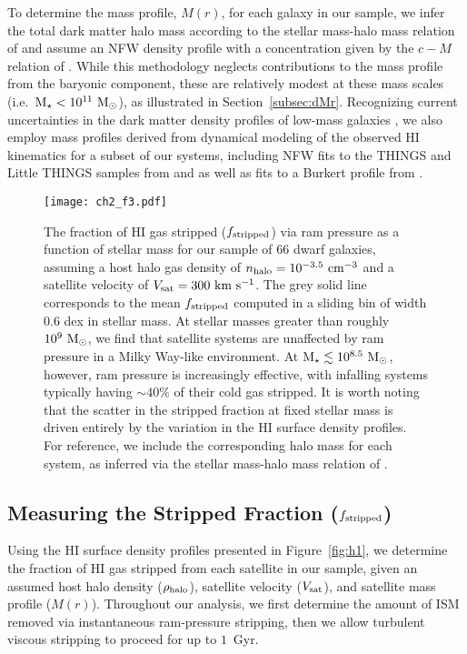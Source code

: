 To determine the mass profile, $M(r)$, for each galaxy in our sample,
we infer the total dark matter halo mass according to the stellar
mass-halo mass relation of \citet{gk14} and assume an NFW density
profile \citep{nfw97} with a concentration given by the $c-M$ relation
of \citet{klypin11}.
%
While this methodology neglects contributions to the mass profile from
the baryonic component, these are relatively modest at these mass
scales (i.e.~${\rm M}_{\star} < 10^{11}~{\rm M}_{\odot}$), as illustrated in
Section~\ref{subsec:dMr}.
%
Recognizing current uncertainties in the dark matter density profiles
of low-mass galaxies \citep[e.g.][]{moore94, deblok01, bk11, bk12}, we
also employ mass profiles derived from dynamical modeling of the
observed H{\scriptsize I} kinematics for a subset of our systems,
including NFW fits to the THINGS and Little THINGS samples from
\citet{deblok08} and \citet{oh15} as well as fits to a Burkert profile
\citep{burkert95} from \citet{pace16}.



\begin{figure*}
 \centering
 \hspace*{-0.2in}
 \texttt{[image: ch2\_f3.pdf]}
 \caption{The fraction of H{\scriptsize I} gas stripped ($f_{\rm
     stripped}$) via ram pressure as a function of stellar mass for
   our sample of $66$ dwarf galaxies, assuming a host halo gas density
   of $n_{\rm halo} = 10^{-3.5}~{\rm cm}^{-3}$ and a satellite
   velocity of $V_{\rm sat}=300~{\rm km}~{\rm s}^{-1}$. The grey solid
   line corresponds to the mean $f_{\rm stripped}$ computed in a
   sliding bin of width $0.6$ dex in stellar mass. At stellar masses
   greater than roughly $10^{9}~{\rm M}_{\odot}$, we find that satellite systems
   are unaffected by ram pressure in a Milky Way-like environment. At
   ${\rm M}_{\star} \lesssim 10^{8.5}~{\rm M}_{\odot}$, however, ram pressure is
   increasingly effective, with infalling systems typically having
   $\sim 40\%$ of their cold gas stripped. It is worth noting that the
   scatter in the stripped fraction at fixed stellar mass is driven
   entirely by the variation in the H{\scriptsize I} surface density
   profiles. For reference, we include
   the corresponding halo mass for each system, as inferred via the
   stellar mass-halo mass relation of \citet{gk14}.}
\label{fig:fid}
\end{figure*}


\subsection{Measuring the Stripped Fraction (\boldmath$f_{\rm stripped}$)}
\label{subsec:frac} 
Using the H{\scriptsize I} surface density profiles presented in
Figure~\ref{fig:h1}, we determine the fraction of H{\scriptsize I} gas
stripped from each satellite in our sample, given an assumed host halo
density ($\rho_{\rm halo}$), satellite velocity ($V_{\rm sat}$), and
satellite mass profile ($M(r)$).
%
Throughout our analysis, we first determine the amount of ISM removed
via instantaneous ram-pressure stripping, then we allow turbulent
viscous stripping to proceed for up to $1$~Gyr.


